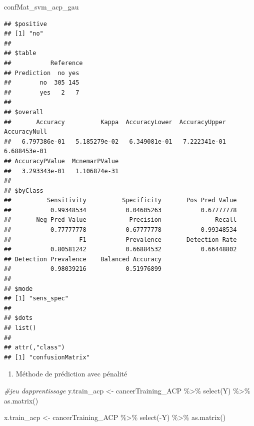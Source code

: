 \documentclass[
  12pt,
]{article}
\newenvironment{Shaded}{\begin{snugshade}}{\end{snugshade}}
\newcommand{\CommentTok}[1]{\textcolor[rgb]{0.56,0.35,0.01}{\textit{#1}}}
\newcommand{\FunctionTok}[1]{\textcolor[rgb]{0.00,0.00,0.00}{#1}}
\newcommand{\NormalTok}[1]{#1}
\newcommand{\OtherTok}[1]{\textcolor[rgb]{0.56,0.35,0.01}{#1}}
\newcommand{\SpecialCharTok}[1]{\textcolor[rgb]{0.00,0.00,0.00}{#1}}
\providecommand{\tightlist}{%
  \setlength{\itemsep}{0pt}\setlength{\parskip}{0pt}}
\begin{document}
\begin{Shaded}
\begin{Highlighting}[]
\NormalTok{confMat\_svm\_acp\_gau}
\end{Highlighting}
\end{Shaded}

\begin{verbatim}
## $positive
## [1] "no"
## 
## $table
##           Reference
## Prediction  no yes
##        no  305 145
##        yes   2   7
## 
## $overall
##       Accuracy          Kappa  AccuracyLower  AccuracyUpper   AccuracyNull 
##   6.797386e-01   5.185279e-02   6.349081e-01   7.222341e-01   6.688453e-01 
## AccuracyPValue  McnemarPValue 
##   3.293343e-01   1.106874e-31 
## 
## $byClass
##          Sensitivity          Specificity       Pos Pred Value 
##           0.99348534           0.04605263           0.67777778 
##       Neg Pred Value            Precision               Recall 
##           0.77777778           0.67777778           0.99348534 
##                   F1           Prevalence       Detection Rate 
##           0.80581242           0.66884532           0.66448802 
## Detection Prevalence    Balanced Accuracy 
##           0.98039216           0.51976899 
## 
## $mode
## [1] "sens_spec"
## 
## $dots
## list()
## 
## attr(,"class")
## [1] "confusionMatrix"
\end{verbatim}

\begin{enumerate}
\def\labelenumi{\arabic{enumi}.}
\setcounter{enumi}{2}
\tightlist
\item
  Méthode de prédiction avec pénalité
\end{enumerate}

\begin{Shaded}
\begin{Highlighting}[]
\CommentTok{\#jeu d\textquotesingle{}apprentissage }
\NormalTok{y.train\_acp }\OtherTok{\textless{}{-}}\NormalTok{ cancerTraining\_ACP }\SpecialCharTok{\%\textgreater{}\%} 
  \FunctionTok{select}\NormalTok{(Y) }\SpecialCharTok{\%\textgreater{}\%}
  \FunctionTok{as.matrix}\NormalTok{()}

\NormalTok{x.train\_acp }\OtherTok{\textless{}{-}}\NormalTok{ cancerTraining\_ACP }\SpecialCharTok{\%\textgreater{}\%} 
  \FunctionTok{select}\NormalTok{(}\SpecialCharTok{{-}}\NormalTok{Y) }\SpecialCharTok{\%\textgreater{}\%} 
  \FunctionTok{as.matrix}\NormalTok{()}
\end{Highlighting}
\end{Shaded}
\end{document}
